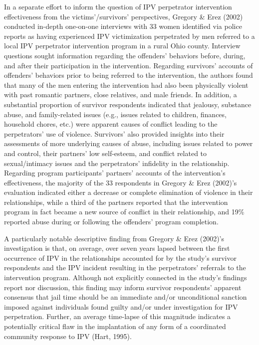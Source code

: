 \documentclass[11pt,]{tufte-book}
\begin{document}
In a separate effort to inform the question of IPV perpetrator
intervention effectiveness from the victims'/survivors' perspectives,
Gregory \& Erez (2002) conducted in-depth one-on-one interviews with 33
women identified via police reports as having experienced IPV
victimization perpetrated by men referred to a local IPV perpetrator
intervention program in a rural Ohio county. Interview questions sought
information regarding the offenders' behaviors before, during, and after
their participation in the intervention. Regarding survivors' accounts
of offenders' behaviors prior to being referred to the intervention, the
authors found that many of the men entering the intervention had also
been physically violent with past romantic partners, close relatives,
and male friends. In addition, a substantial proportion of survivor
respondents indicated that jealousy, substance abuse, and family-related
issues (e.g., issues related to children, finances, household chores,
etc.) were apparent causes of conflict leading to the perpetrators' use
of violence. Survivors' also provided insights into their assessments of
more underlying causes of abuse, including issues related to power and
control, their partners' low self-esteem, and conflict related to
sexual/intimacy issues and the perpetrators' infidelity in the
relationship. Regarding program participants' partners' accounts of the
intervention's effectiveness, the majority of the 33 respondents in
Gregory \& Erez (2002)'s evaluation indicated either a decrease or
complete elimination of violence in their relationships, while a third
of the partners reported that the intervention program in fact became a
new source of conflict in their relationship, and 19\% reported abuse
during or following the offenders' program completion.

A particularly notable descriptive finding from Gregory \& Erez (2002)'s
investigation is that, on average, over seven years lapsed between the
first occurrence of IPV in the relationships accounted for by the
study's survivor respondents and the IPV incident resulting in the
perpetrators' referrals to the intervention program. Although not
explicitly connected in the study's findings report nor discussion, this
finding may inform survivor respondents' apparent consensus that jail
time should be an immediate and/or unconditional sanction imposed
against individuals found guilty and/or under investigation for IPV
perpetration. Further, an average time-lapse of this magnitude indicates
a potentially critical flaw in the implantation of any form of a
coordinated community response to IPV (Hart, 1995).
\end{document}
